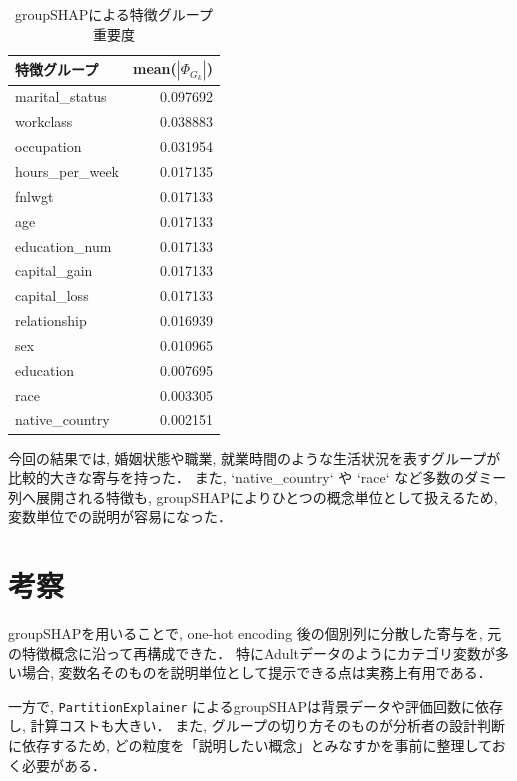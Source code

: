 \documentclass{article}
\begin{document}
\begin{table}[H]
    \centering
    \caption{groupSHAPによる特徴グループ重要度}
    \label{tab:groupshap_result}
    \begin{tabular}{lr}
        \toprule
        特徴グループ & mean($|\Phi_{G_k}|$) \\
        \midrule
        marital\_status & 0.097692 \\
        workclass & 0.038883 \\
        occupation & 0.031954 \\
        hours\_per\_week & 0.017135 \\
        fnlwgt & 0.017133 \\
        age & 0.017133 \\
        education\_num & 0.017133 \\
        capital\_gain & 0.017133 \\
        capital\_loss & 0.017133 \\
        relationship & 0.016939 \\
        sex & 0.010965 \\
        education & 0.007695 \\
        race & 0.003305 \\
        native\_country & 0.002151 \\
        \bottomrule
    \end{tabular}
\end{table}

今回の結果では, 婚姻状態や職業, 就業時間のような生活状況を表すグループが比較的大きな寄与を持った．
また, `native\_country` や `race` など多数のダミー列へ展開される特徴も, groupSHAPによりひとつの概念単位として扱えるため, 変数単位での説明が容易になった．

\section{考察}
groupSHAPを用いることで, one-hot encoding 後の個別列に分散した寄与を, 元の特徴概念に沿って再構成できた．
特にAdultデータのようにカテゴリ変数が多い場合, 変数名そのものを説明単位として提示できる点は実務上有用である．

一方で, \texttt{PartitionExplainer} によるgroupSHAPは背景データや評価回数に依存し, 計算コストも大きい\cite{jullum2021groupshapley}．
また, グループの切り方そのものが分析者の設計判断に依存するため, どの粒度を「説明したい概念」とみなすかを事前に整理しておく必要がある．

\printbibliography[title={参考文献}]
\end{document}
